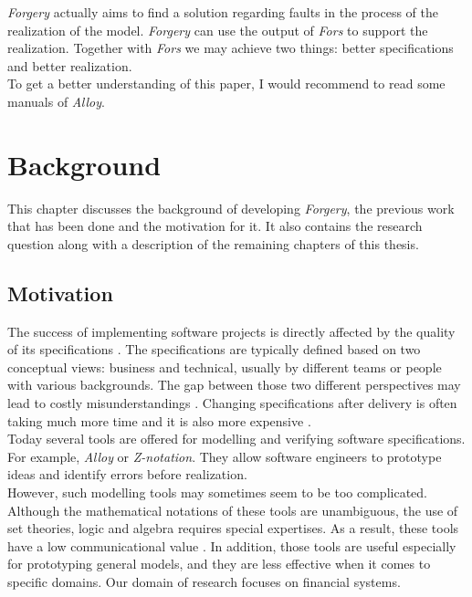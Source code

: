\documentclass[oneside]{book}
\begin{document}
\textit{Forgery} actually aims to find a solution regarding faults in the process of the realization of the model. \textit{Forgery} can use the output of \textit{Fors} to support the realization. Together with \textit{Fors} we may achieve two things: better specifications and better realization.\\

To get a better understanding of this paper, I would recommend to read some manuals of \textit{Alloy}.
\newpage

\chapter{Background}
This chapter discusses the background of developing \textit{Forgery}, the previous work that has been done and the motivation for it. It also contains the research question along with a description of the remaining chapters of this thesis.

\section{Motivation}

The success of implementing software projects is directly affected by the quality of its specifications \cite[p.~12]{requirements}. The specifications are typically defined based on two conceptual views: business and technical, usually by different teams or people with various backgrounds. The gap between those two different perspectives may lead to costly misunderstandings \cite[p.~1]{fors}. Changing specifications after delivery is often taking much more time and it is also more expensive \cite{defectstopten}.\\

Today several tools are offered for modelling and verifying software specifications. For example, \textit{Alloy} or \textit{Z-notation}. They allow software engineers to prototype ideas and identify errors before realization.\\

However, such modelling tools may sometimes seem to be too complicated. Although the mathematical notations of these tools are unambiguous, the use of set theories, logic and algebra requires special expertises. As a result, these tools have a low communicational value \cite[p.~10]{fors}. In addition, those tools are useful especially for prototyping general models, and they are less effective when it comes to specific domains. Our domain of research focuses on financial systems. \\
\end{document}
